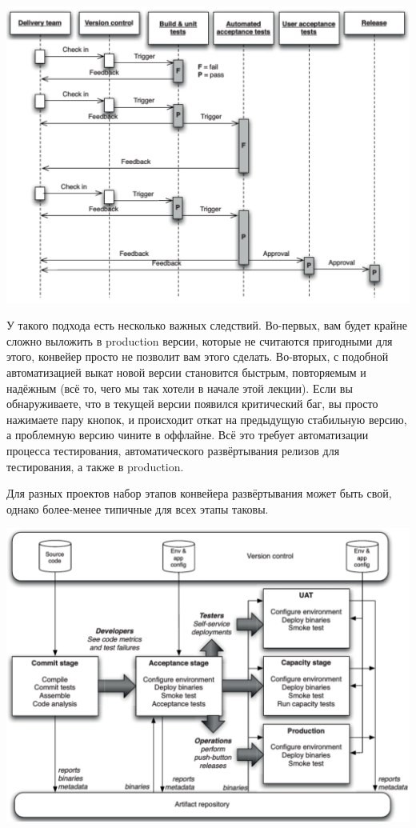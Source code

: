 \documentclass{../../text-style}
\begin{document}
\begin{center}
    \includegraphics[width=\textwidth]{cdPipeline.png}
\end{center}

У такого подхода есть несколько важных следствий. Во-первых, вам будет крайне сложно выложить в production версии, которые не считаются пригодными для этого, конвейер просто не позволит вам этого сделать. Во-вторых, с подобной автоматизацией выкат новой версии становится быстрым, повторяемым и надёжным (всё то, чего мы так хотели в начале этой лекции). Если вы обнаруживаете, что в текущей версии появился критический баг, вы просто нажимаете пару кнопок, и происходит откат на предыдущую стабильную версию, а проблемную версию чините в оффлайне. Всё это требует автоматизации процесса тестирования, автоматического развёртывания релизов для тестирования, а также в production.

Для разных проектов набор этапов конвейера развёртывания может быть свой, однако более-менее типичные для всех этапы таковы.

\begin{center}
    \includegraphics[width=\textwidth]{cdStages.png}
\end{center}
\end{document}
